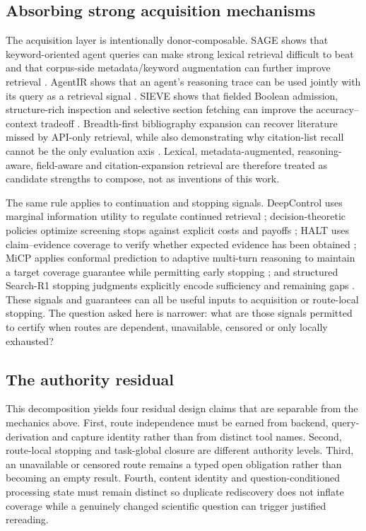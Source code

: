 \subsection{Absorbing strong acquisition mechanisms}

The acquisition layer is intentionally donor-composable.  SAGE shows that
keyword-oriented agent queries can make strong lexical retrieval difficult to
beat and that corpus-side metadata/keyword augmentation can further improve
retrieval \cite{sage2026}.  AgentIR shows that an agent's reasoning trace can be
used jointly with its query as a retrieval signal \cite{agentir2026}.  SIEVE
shows that fielded Boolean admission, structure-rich inspection and selective
section fetching can improve the accuracy--context tradeoff
\cite{sieve2026}.  Breadth-first bibliography expansion can recover literature
missed by API-only retrieval, while also demonstrating why citation-list recall
cannot be the only evaluation axis \cite{rethinkinglitsearch2026}.  Lexical,
metadata-augmented, reasoning-aware, field-aware and citation-expansion
retrieval are therefore treated as candidate strengths to compose, not as
inventions of this work.

The same rule applies to continuation and stopping signals.  DeepControl uses
marginal information utility to regulate continued retrieval
\cite{deepcontrol2026}; decision-theoretic policies optimize screening stops
against explicit costs and payoffs \cite{decisionstop2026}; HALT uses
claim--evidence coverage to verify whether expected evidence has been obtained
\cite{halt2026}; MiCP applies conformal prediction to adaptive multi-turn
reasoning to maintain a target coverage guarantee while permitting early stopping
\cite{micp2026}; and structured Search-R1 stopping judgments explicitly encode
sufficiency and remaining gaps \cite{multiragstop2026}.  These signals and
guarantees can all be useful inputs to acquisition or route-local stopping.  The
question asked here is narrower: what are those signals permitted to certify
when routes are dependent, unavailable, censored or only locally exhausted?

\subsection{The authority residual}

This decomposition yields four residual design claims that are separable from
the mechanics above.  First, route independence must be earned from backend,
query-derivation and capture identity rather than from distinct tool names.
Second, route-local stopping and task-global closure are different authority
levels.  Third, an unavailable or censored route remains a typed open obligation
rather than becoming an empty result.  Fourth, content identity and
question-conditioned processing state must remain distinct so duplicate
rediscovery does not inflate coverage while a genuinely changed scientific
question can trigger justified rereading.

